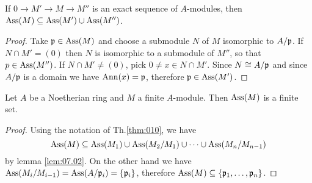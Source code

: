 \documentclass[../main]{subfiles}
\begin{document}
\begin{parlemma}\label{lem:07.02}
If $0\longrightarrow M'\longrightarrow M\longrightarrow M''$ is an exact sequence of $A$-modules, then $\operatorname{Ass}(M)\subseteq\operatorname{Ass}(M')\cup\operatorname{Ass}(M'')$.
\end{parlemma}
\begin{proof}
Take $\mathfrak{p}\in\operatorname{Ass}(M)$ and choose a submodule $N$ of $M$ isomorphic to $A/\mathfrak{p}$. If $N\cap M'=(0)$ then $N$ is isomorphic to a submodule of $M''$, so that $p\in\operatorname{Ass}(M'')$. If $N\cap M'\neq(0)$, pick $0\neq x\in N\cap M'$. Since $N\cong A/\mathfrak{p}$ and since $A/\mathfrak{p}$ is a domain we have $\operatorname{Ann}(x)=\mathfrak{p}$, therefore $\mathfrak{p}\in\operatorname{Ass}(M')$.
\end{proof}

\begin{parproposition}\label{pro:07.02}
Let $A$ be a Noetherian ring and $M$ a finite $A$-module. Then $\operatorname{Ass}(M)$ is a finite set.
\end{parproposition}
\begin{proof}
Using the notation of Th.\ref{thm:010}, we have \[\operatorname{Ass}(M)\subseteq\operatorname{Ass}(M_1)\cup\operatorname{Ass}(M_2/M_1)\cup\cdots\cup\operatorname{Ass}(M_n/M_{n-1})\] by lemma \ref{lem:07.02}. On the other hand we have $\operatorname{Ass}(M_i/M_{i-1})=\operatorname{Ass}(A/\mathfrak{p}_i)=\{\mathfrak{p}_i\}$, therefore $\operatorname{Ass}(M)\subseteq\{\mathfrak{p}_1,\dots,\mathfrak{p}_n\}$.
\end{proof}
\end{document}
